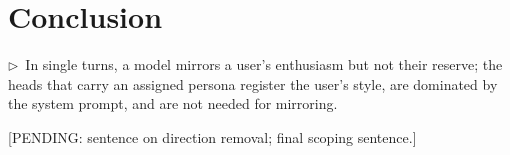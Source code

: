 \documentclass[11pt]{article}
\newcommand{\flow}[1]{\par\noindent\textcolor{blue!60!black}{\small$\triangleright$\ #1}\par\medskip}
\newcommand{\pending}[1]{\par\noindent\textcolor{orange!80!black}{\small[PENDING: #1]}\par\medskip}
\begin{document}
\section{Conclusion}
\flow{In single turns, a model mirrors a user's enthusiasm but not their reserve; the heads that carry an assigned persona register the user's style, are dominated by the system prompt, and are not needed for mirroring.}
\pending{sentence on direction removal; final scoping sentence.}


\end{document}
